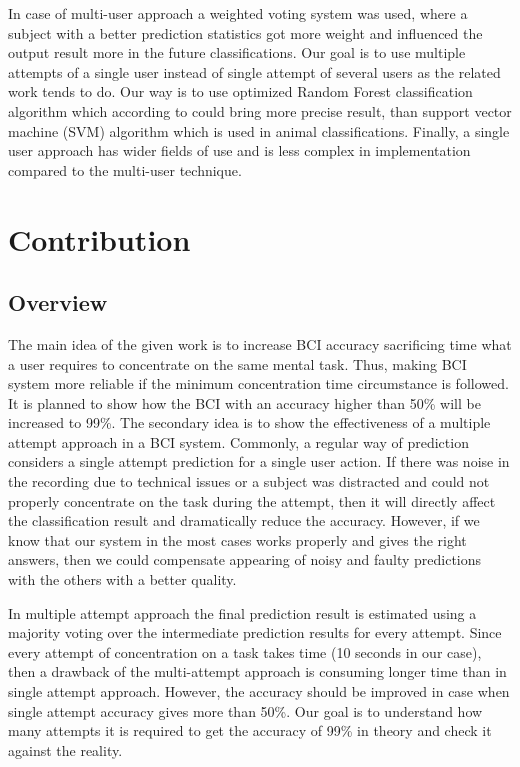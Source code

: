 \documentclass[12pt]{article}
\theoremstyle{definition}
\begin{document}
In case of multi-user approach a weighted voting system was used, where a subject with a better prediction statistics got more weight and influenced the output result more in the future classifications. Our goal is to use multiple attempts of a single user instead of single attempt of several users as the related work tends to do. Our way is to use optimized Random Forest classification algorithm which according to \cite{masso} could bring more precise result, than support vector machine (SVM) algorithm which is used in animal classifications. Finally, a single user approach has wider fields of use and is less complex in implementation compared to the multi-user technique.

\newpage
\section{Contribution}

\subsection{Overview}
The main idea of the given work is to increase BCI accuracy sacrificing time what a user requires to concentrate on the same mental task. Thus, making BCI system more reliable if the minimum concentration time circumstance is followed. It is planned to show how the BCI with an accuracy higher than 50\% will be increased to 99\%.
The secondary idea is to show the effectiveness of a multiple attempt approach in a BCI system. 
Commonly, a regular way of prediction considers a single attempt prediction for a single user action. If there was noise in the recording due to technical issues or a subject was distracted and could not properly concentrate on the task during the attempt, then it will directly affect the classification result and dramatically reduce the accuracy. However, if we know that our system in the most cases works properly and gives the right answers, then we could compensate appearing of noisy and faulty predictions with the others with a better quality.

In multiple attempt approach the final prediction result is estimated using a majority voting over the intermediate prediction results for every attempt. Since every attempt of concentration on a task takes time (10 seconds in our case), then a drawback of the multi-attempt approach is consuming longer time than in single attempt approach. However, the accuracy should be improved in case when single attempt accuracy gives more than 50\%. Our goal is to understand how many attempts it is required to get the accuracy of 99\% in theory and check it against the reality.
\end{document}
